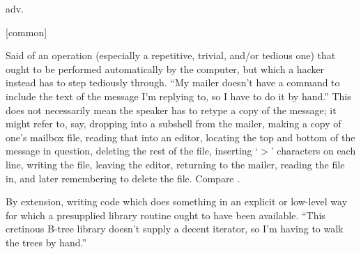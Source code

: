  adv.

[common]
\begin{inparaenum}
\item Said of an operation (especially a repetitive, trivial, and/or tedious
    one) that ought to be performed automatically by the computer, but which a
    hacker instead has to step tediously through. ``My mailer doesn't have a
    command to include the text of the message I'm replying to, so I have to do
    it by hand.'' This does not necessarily mean the speaker has to retype a
    copy of the message; it might refer to, say, dropping into a subshell from
    the mailer, making a copy of one's mailbox file, reading that into an
    editor, locating the top and bottom of the message in question, deleting the
    rest of the file, inserting `$>$' characters on each line, writing the file,
    leaving the editor, returning to the mailer, reading the file in, and later
    remembering to delete the file. Compare .
\item By extension, writing code which does something in an explicit or
    low-level way for which a presupplied library routine ought to have been
    available. ``This cretinous B-tree library doesn't supply a decent iterator,
    so I'm having to walk the trees by hand.''
\end{inparaenum}

